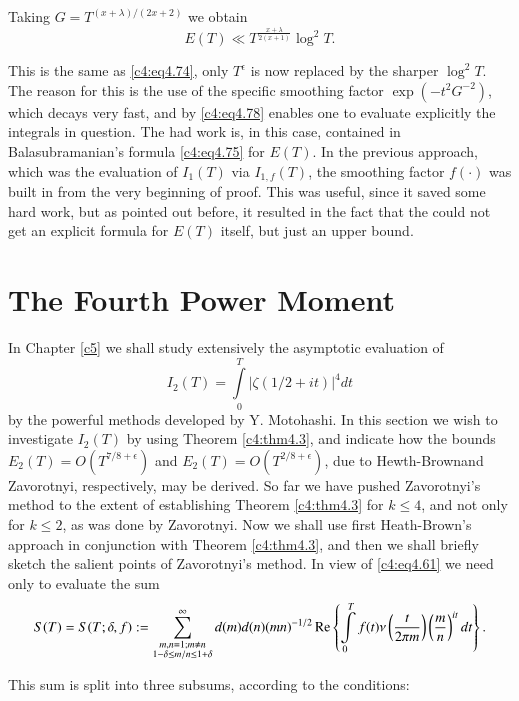 Taking $G=T^{(x + \lambda)/(2 x+2)}$ we obtain
\begin{equation}
  E(T) \ll T^{\frac{ x + \lambda}{2 (x+1)}} \log^2
  T.\label{c4:eq4.80} 
\end{equation}

This is the same as \eqref{c4:eq4.74}, only $T^\epsilon$ is now
replaced by the sharper $\log^2T$. The reason for this is the use of
the specific smoothing factor $\exp (-t^2 G^{-2})$, which decays very
fast, and by \eqref{c4:eq4.78} enables one to evaluate explicitly the
integrals in question. The had work is, in this case, contained in
Balasubramanian's formula \eqref{c4:eq4.75} for $E(T)$. In the
previous approach, which was the evaluation of $I_1 (T)$ via $I_{1, f}
(T)$, the smoothing factor $f(\cdot)$ was built in from the very
beginning of proof. This was useful, since it saved some hard work,
but as pointed out before, it resulted in the fact that the could not
get an explicit formula for $E(T)$ itself, but just an upper bound.

\section{The Fourth Power Moment}\label{c4:sec4.6}

In Chapter \ref{c5} we shall study extensively the asymptotic evaluation of 
$$
I_2 (T) = \int\limits_0^T |\zeta (1/2 + it)|^4 dt 
$$
by the powerful methods developed by Y. Motohashi. In this section we
wish to investigate $I_2 (T)$ by using Theorem \ref{c4:thm4.3}, and
indicate how the bounds $E_2 (T) = O(T^{7/8+\epsilon})$ and $E_2 (T)=
O(T^{2/8+\epsilon})$, due to Hewth-Brown\pageoriginale and Zavorotnyi,
respectively, may be derived. So far we have pushed Zavorotnyi's
method to the extent of establishing Theorem \ref{c4:thm4.3} for $k
\leq 4$, and not only for $k \leq 2$, as was done by Zavorotnyi. Now
we shall use first Heath-Brown's approach in conjunction with Theorem
\ref{c4:thm4.3}, and then we shall briefly sketch the salient points
of Zavorotnyi's method. In view of \eqref{c4:eq4.61} we need only to
evaluate the sum
{\fontsize{9}{11}\selectfont
$$ 
 S(T)= S(T; \delta, f): = 
  \sum^\infty_{\substack{m, n=1; m\neq n\\1- \delta\leq
      m/n \leq 1+ \delta}} d(m) d(n) (mn)^{-1/2} \operatorname{Re} \left\{\int\limits_0^T f(t)
  \nu \left(\frac{t}{2 \pi m} \right) \left(\frac{m}{n}\right)^{it}dt\right\}.
$$}

This sum is split into three subsums, according to the conditions: 

